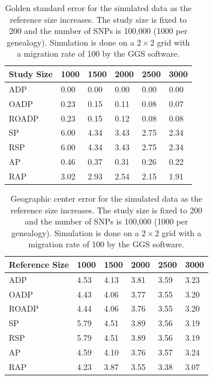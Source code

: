 \documentclass{article}
\begin{document}
\begin{table}
  \centering
  \begin{tabular}{|l|l|l|l|l|l|}
    \hline
    Study Size & 1000  & 1500 & 2000 & 2500 & 3000 \\
    \hline
    ADP        & 0.00  & 0.00 & 0.00 & 0.00 & 0.00 \\
    OADP       & 0.23  & 0.15 & 0.11 & 0.08 & 0.07 \\
    ROADP      & 0.23  & 0.15 & 0.12 & 0.08 & 0.08 \\
    SP         & 6.00  & 4.34 & 3.43 & 2.75 & 2.34 \\
    RSP        & 6.00  & 4.34 & 3.43 & 2.75 & 2.34 \\
    AP         & 0.46  & 0.37 & 0.31 & 0.26 & 0.22 \\
    RAP        & 3.02  & 2.93 & 2.54 & 2.15 & 1.91 \\
    \hline
  \end{tabular}
  \caption{
    Golden standard error for the simulated data as the reference size increases.
    The study size is fixed to 200 and the number of SNPs is 100,000 (1000 per genealogy). 
    Simulation is done on a $2 \times 2$ grid with a migration rate of 100 by the GGS software. 
  }
  \label{tbl:nChg-accuracy-gold}
\end{table}

\begin{table}
  \centering
  \begin{tabular}{|l|l|l|l|l|l|}
    \hline
    Reference Size & 1000  & 1500 & 2000 & 2500 & 3000 \\
    \hline
    ADP        & 4.53  & 4.13 & 3.81 & 3.59 & 3.23 \\
    OADP       & 4.43  & 4.06 & 3.77 & 3.55 & 3.20 \\
    ROADP      & 4.44  & 4.06 & 3.76 & 3.55 & 3.20 \\
    SP         & 5.79  & 4.51 & 3.89 & 3.56 & 3.19 \\
    RSP        & 5.79  & 4.51 & 3.89 & 3.56 & 3.19 \\
    AP         & 4.59  & 4.10 & 3.76 & 3.57 & 3.24 \\
    RAP        & 4.23  & 3.87 & 3.55 & 3.38 & 3.07 \\
    \hline
  \end{tabular}
  \caption{
    Geographic center error for the simulated data as the reference size increases.
    The study size is fixed to 200 and the number of SNPs is 100,000 (1000 per genealogy). 
    Simulation is done on a $2 \times 2$ grid with a migration rate of 100 by the GGS software. 
  }
  \label{tbl:nChg-accuracy-ctr}
\end{table}
\end{document}

